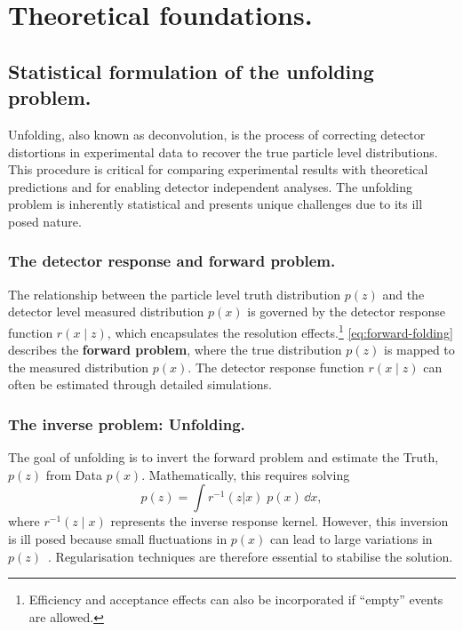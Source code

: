 \chapter{Theoretical foundations.}
\label{chap:theoretical-foundations}
\chapterminitoc
\section{Statistical formulation of the unfolding problem.}
\sectionminitoc

Unfolding, also known as deconvolution, is the process of correcting detector distortions in experimental data to recover the true particle level distributions.
%
This procedure is critical for comparing experimental results with theoretical predictions and for enabling detector independent analyses.
%
The unfolding problem is inherently statistical and presents unique challenges due to its ill posed nature.

\subsection{The detector response and forward problem.}

The relationship between the particle level truth distribution \(p(z)\) and the detector level measured distribution \(p(x)\) is governed by the detector response function \(r(x\mid z)\), which encapsulates the resolution effects.\footnote{Efficiency and acceptance effects can also be incorporated if ``empty'' events are allowed.}
%
\cref{eq:forward-folding} describes the \textbf{forward problem}, where the true distribution \(p(z)\) is mapped to the measured distribution \(p(x)\).
%
The detector response function \(r(x\mid z)\) can often be estimated through detailed simulations.

\subsection{The inverse problem: Unfolding.}

The goal of unfolding is to invert the forward problem and estimate the Truth, \(p(z)\) from Data \(p(x)\).
%
Mathematically, this requires solving
\begin{equation}
    \label{eq:inverse-problem}
    p(z) = \int r^{-1}(z|x) \;p(x) \, \dd x,
\end{equation}
where \(r^{-1}(z\mid x)\) represents the inverse response kernel.
%
However, this inversion is ill posed because small fluctuations in \(p(x)\) can lead to large variations in \(p(z)\)~\cite{2005InverseMeasurements}.
%
Regularisation techniques are therefore essential to stabilise the solution.

